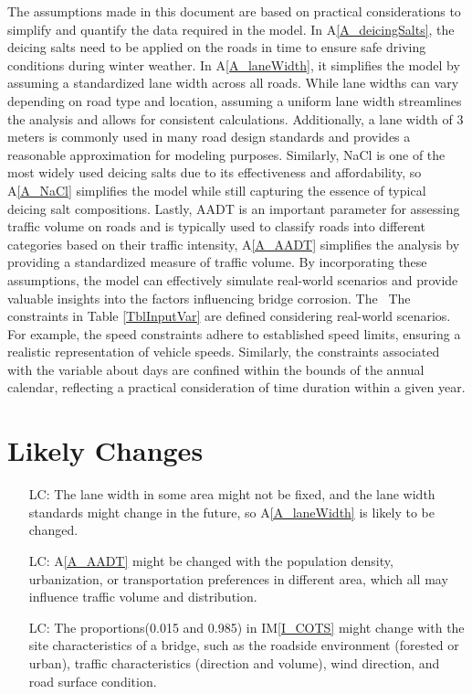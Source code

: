 \documentclass[12pt]{article}
\newcommand{\aref}[1]{A\ref{#1}}
\newcommand{\iref}[1]{IM\ref{#1}}
\newcounter{lcnum} %
\begin{document}
The assumptions made in this document are based on practical considerations to simplify and quantify the data required in the model. In \aref{A_deicingSalts}, the deicing salts need to be applied on the roads in time to ensure safe driving conditions during winter weather. In \aref{A_laneWidth}, it simplifies the model by assuming a standardized lane width across all roads. While lane widths can vary depending on road type and location, assuming a uniform lane width streamlines the analysis and allows for consistent calculations. Additionally, a lane width of 3 meters is commonly used in many road design standards and provides a reasonable approximation for modeling purposes. Similarly, NaCl is one of the most widely used deicing salts due to its effectiveness and affordability, so \aref{A_NaCl} simplifies the model while still capturing the essence of typical deicing salt compositions. Lastly, AADT is an important parameter for assessing traffic volume on roads and is typically used to classify roads into different categories based on their traffic intensity, \aref{A_AADT} simplifies the analysis by providing a standardized measure of traffic volume. By incorporating these assumptions, the model can effectively simulate real-world scenarios and provide valuable insights into the factors influencing bridge corrosion.
The \
The constraints in Table \ref{TblInputVar} are defined considering real-world scenarios. For example,  the speed constraints adhere to established speed limits, ensuring a realistic representation of vehicle speeds. Similarly, the constraints associated with the variable about days are confined within the bounds of the annual calendar, reflecting a practical consideration of time duration within a given year.


\section{Likely Changes}    

\noindent \begin{itemize}

\item[LC\refstepcounter{lcnum}\thelcnum\label{LC_laneWidth}:] The lane width in some area might not be fixed, and the lane width standards might change in the future, so \aref{A_laneWidth} is likely to be changed. 
\item[LC\refstepcounter{lcnum}\thelcnum\label{LC_AADT}:] \aref{A_AADT} might be changed with the population density, urbanization, or transportation preferences in different area, which all may influence traffic volume and distribution.
\item[LC\refstepcounter{lcnum}\thelcnum\label{LC_SASC}:] The proportions(0.015 and 0.985) in \iref{I_COTS} might change with the site characteristics of a bridge, such as the roadside environment (forested or urban), traffic characteristics (direction and volume), wind direction, and road surface condition. 

\end{itemize}
\end{document}
